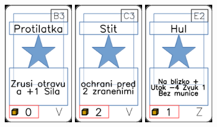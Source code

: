 \documentclass[a4paper]{article}
\begin{document}
	\includegraphics[width=3.0cm]{img-1_67}
	\includegraphics[width=3.0cm]{img-1_72}
	\includegraphics[width=3.0cm]{img-1_81}
\end{document}

